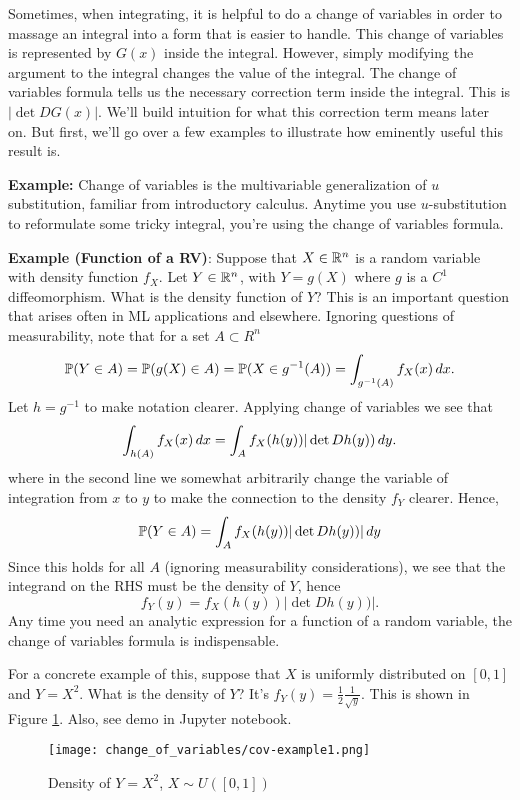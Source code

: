 Sometimes, when integrating, it is helpful to do a change of variables in order to massage an integral into a form that is easier to handle. This change of variables is represented by $G(x)$ inside the integral. However, simply modifying the argument to the integral changes the value of the integral. The change of variables formula tells us the necessary correction term inside the integral. This is $\left| \det DG(x)\right| $. We'll build intuition for what this correction term means later on. But first, we'll go over a few examples to illustrate how eminently useful this result is. 

\vspace{1em}
\noindent 
\textbf{Example:} Change of variables is the multivariable generalization of $u$ substitution, familiar from introductory calculus. Anytime you use $u$-substitution to reformulate some tricky integral, you're using the change of variables formula.  

\vspace{1em} \noindent 
\textbf{Example (Function of a RV)}: Suppose that $X \in \mathbb{R}^n$ is a random variable with density function $f_X$. Let $Y\in \mathbb{R}^n$, with $Y = g(X)$ where $g$ is a $C^1$ diffeomorphism. What is the density function of $Y$? This is an important question that arises often in ML applications and elsewhere. Ignoring questions of measurability, note that for a set $A\subset R^n$ 
\begin{align}
\mathbb{P}(Y \in A) = \mathbb{P}(g(X) \in A) = \mathbb{P}(X \in g^{-1}(A)) = \int_{g^{-1}(A)} f_X(x)\, dx. 
\end{align}
Let $h =g^{-1}$ to make notation clearer. Applying change of variables we see that
$$
\int_{h(A)} f_X(x)\, dx = \int_A f_X(h(y)) |\det Dh(y))\, dy. 
$$
where in the second line we somewhat arbitrarily change the variable of integration from $x$ to $y$ to make the connection to the density $f_Y$ clearer.
Hence,
$$
\mathbb{P}(Y\in A) = \int_A f_X(h(y)) |\det Dh(y))|\, dy
$$
Since this holds for all $A$ (ignoring measurability considerations), we see that the integrand on the RHS must be the density of $Y$, hence
\begin{equation} \label{eq:pushforwardY} %
f_Y(y) = f_X(h(y)) |\det Dh(y))|.
\end{equation}
Any time you need an analytic expression for a function of a random variable, the change of variables formula is indispensable. 

For a concrete example of this, suppose that $X$ is uniformly distributed on $[0,1]$ and $Y = X^2$. What is the density of $Y$? It's $f_Y(y) = \frac{1}{2}\frac{1}{\sqrt{y}}$. This is shown in Figure \ref{fig:cov-example1}. Also, see demo in Jupyter notebook.
\begin{figure}[h] \label{fig:cov-example1}
\centering
\centering
\texttt{[image: change\_of\_variables/cov-example1.png]}
\caption{Density of $Y = X^2$, $X\sim U([0,1])$}
\end{figure}

